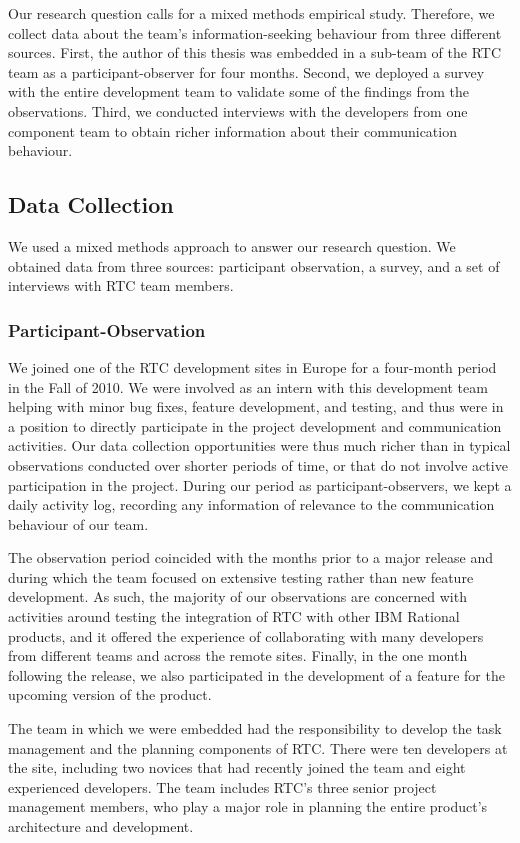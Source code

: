 Our research question calls for a mixed methods empirical study. Therefore, we collect data about the team's information-seeking behaviour from three different sources.
First, the author of this thesis was embedded in a sub-team of the RTC team as a participant-observer for four months.
Second, we deployed a survey with the entire development team to validate some of the findings from the observations.
Third, we conducted interviews with the developers from one component team to obtain richer information about their communication behaviour.


\subsection{Data Collection}
We used a mixed methods approach to answer our research question. We obtained data from three sources: participant observation, a survey, and a set of interviews with RTC team members.

\subsubsection{Participant-Observation}
We joined one of the RTC development sites in Europe for a four-month period in the Fall of 2010. We were involved as an intern with this development team helping with minor bug fixes, feature development, and testing, and thus were in a position to directly participate in the project development and communication activities. Our data collection opportunities were thus much richer than in typical observations conducted over shorter periods of time, or that do not involve active participation in the project.  During our period as participant-observers, we kept a daily activity log, recording any information of relevance to the communication behaviour of our team.

The observation period coincided with the months prior to a major release and during which the team focused on extensive testing rather than new feature development. As such, the majority of our observations are concerned with activities around testing the integration of RTC with other IBM Rational products, and it offered the experience of collaborating with many developers from different teams and across the remote sites. Finally, in the one month following the release, we also participated in the development of a feature for the upcoming version of the product.

The team in which we were embedded had the responsibility to develop the task management and the planning components of RTC. There were ten developers at the site, including two novices that had recently joined the team and eight experienced developers. The team includes RTC's three senior project management members, who play a major role in planning the entire product's architecture and development.


